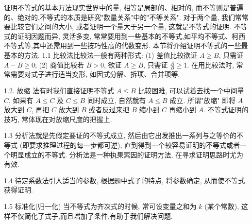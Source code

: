 
证明不等式的基本万法现实世界中的量, 相等是局部的、相对的, 而不等则是普遍的、绝对的,不等式的本质是研究"数量关系"中的"不等关系".
对于两个量, 我们常常要比较它们之间的大小, 或者证明一个量大于另一个量, 这就是不等式的证明.
不等式的证明因题而异, 灵活多变, 常常要用到一些基本的不等式,如平均不等式、柯西不等式等,其中还需用到一些技巧性高的代数变形.
本节将介绍证明不等式的一些最基本的方法.
1.1 比较法比较法一般有两种形式:
(1) 差值比较欲证 $A \geqslant B$, 只需证 $A-B \geqslant 0$;
(2) 商值比较若 $B>0$, 欲证 $A \geqslant B$, 只需证 $\frac{A}{B} \geqslant 1$.
在用比较法时, 常常需要对式子进行适当变形, 如因式分解、拆项、合并项等.



1.2. 放缩 法有时我们直接证明不等式 $A \leqslant B$ 比较困难, 可以试着去找一个中间量 $C$,
如果有 $A \leqslant C$ 及 $C \leqslant B$ 同时成立, 自然就有 $A \leqslant B$ 成立.
所谓"放缩" 即将 $A$ 放大到 $C$, 再把 $C$ 放大到 $B$ 或者反过来把 $B$ 缩小到 $C$ 再缩小到 $A$. 不等式证明的技巧, 常体现在对放缩尺度的把握上.



1.3 分析法就是先假定要证的不等式成立, 然后由它出发推出一系列与之等价的不等式 (即要求推理过程的每一步都可逆), 直到得到一个较容易证明的不等式或者一个明显成立的不等式.
分析法是一种执果索因的证明方法, 在寻求证明思路时尤为有效.



1.4 待定系数法引人适当的参数, 根据题中式子的特点, 将参数确定, 从而使不等式获得证明.



1.5 标准化(归一化)
当不等式为齐次式的时候, 常可设变量之和为 $k$ (某个常数), 这样不仅简化了式子,而且增加了条件,有助于我们解决问题.



